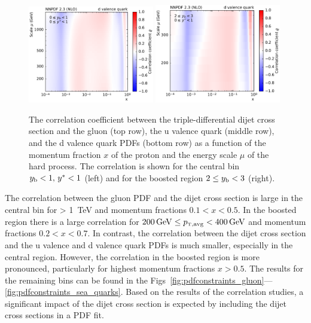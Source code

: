 \begin{figure}[p]
  \includegraphics[width=0.49\textwidth]{figures/pdf_constraints/corr_PTMAXEXPYS_YBYS_NLO_FINALBINS_NNPDF23_d_valence_quark_ys0_0yb0_0_cl.pdf}\hfill%
  \includegraphics[width=0.49\textwidth]{figures/pdf_constraints/corr_PTMAXEXPYS_YBYS_NLO_FINALBINS_NNPDF23_d_valence_quark_ys0_0yb2_0_cl.pdf}
  \caption[Correlation between dijet cross section and PDFs]{
    The correlation coefficient between the triple-differential dijet cross
    section and the gluon (top row), the u valence quark (middle row),
    and the d valence quark PDFs (bottom row) as a function of the
    momentum fraction $x$ of the proton and the energy scale $\mu$ of
    the hard process. The correlation is shown for the central
    bin $y_{\mathrm{b}} < 1,\,y^* < 1$ (left) and for the boosted region $2 \leq
    y_{\mathrm{b}} < 3$ (right).}
  \label{fig:correlation_pdf_xs_gqq}
\end{figure}

The correlation between the gluon PDF and the dijet cross section is large in
the central bin for \ptavg > \SI{1}{\TeV} and momentum fractions $0.1 < x <
0.5$. In the boosted region there is a large correlation for $\SI{200}{\GeV}
\leq \ptavg < \SI{400}{\GeV}$ and momentum fractions $0.2 < x < 0.7$. In
contrast, the correlation between the dijet cross section and the u valence and
d valence quark PDFs is much smaller, especially in the central region. However,
the correlation in the boosted region is more pronounced, particularly for
highest momentum fractions $x > 0.5$. The results for the remaining bins can be
found in the
Figs~\ref{fig:pdfconstraints_gluon}---\ref{fig:pdfconstraints_sea_quarks}. Based
on the results of the correlation studies, a significant impact of the dijet
cross section is expected by including the dijet cross sections in a PDF fit.

